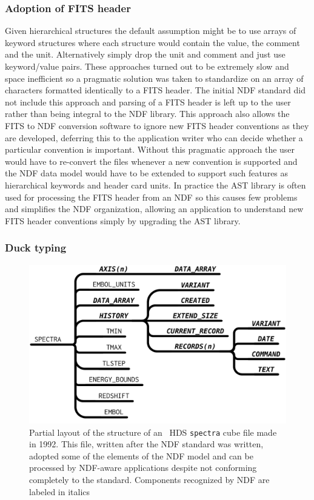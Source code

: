 \documentclass[final,authoryear,5p,times,twocolumn]{elsarticle}
\begin{document}
\subsubsection{Adoption of FITS header}

Given hierarchical structures the default assumption might be to use
arrays of keyword structures where each structure would contain the
value, the comment and the unit. Alternatively simply drop the unit
and comment and just use keyword/value pairs. These approaches turned
out to be extremely slow and space inefficient so a pragmatic solution
was taken to standardize on an array of characters formatted
identically to a FITS header. The initial NDF standard did not include
this approach and parsing of a FITS header is left up to the user
rather than being integral to the NDF library. This approach also allows the FITS to NDF conversion
software to ignore new FITS header conventions as they are developed,
deferring this to the application writer who can decide whether a
particular convention is important. Without this pragmatic approach
the user would have to re-convert the files whenever a new convention
is supported and the NDF data model would have to be extended to
support such features as hierarchical keywords and header card units.
In practice the AST
library \citep{1998ASPC..145...41W} is often used for processing the FITS
header from an NDF so this causes few problems and simplifies the NDF
organization, allowing an application to understand new FITS header
conventions simply by upgrading the AST library.

\subsubsection{Duck typing}

\begin{figure}[t]
\begin{center}
\includegraphics[width=\columnwidth]{model-asterix2}
\end{center}
\caption{Partial layout of the structure of an \asterix\ HDS
  \texttt{spectra} cube file made in 1992. This file, written after the NDF
  standard was written, adopted some of the elements of the
  NDF model and can be processed by NDF-aware applications despite not
  conforming completely to the standard. Components recognized by NDF
  are labeled in italics}
\label{fig:duck}
\end{figure}
\end{document}
